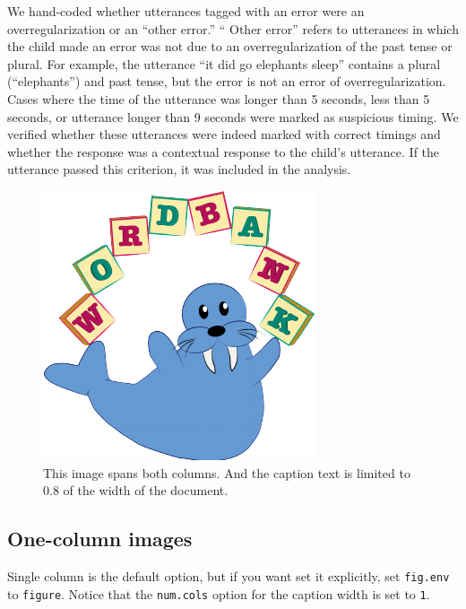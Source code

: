 \documentclass[10pt, letterpaper]{article}
\newenvironment{CodeChunk}{}{}
\begin{document}
We hand-coded whether utterances tagged with an error were an
overregularization or an ``other error.'' `` Other error'' refers to
utterances in which the child made an error was not due to an
overregularization of the past tense or plural. For example, the
utterance ``it did go elephants sleep'' contains a plural
(``elephants'') and past tense, but the error is not an error of
overregularization. Cases where the time of the utterance was longer
than 5 seconds, less than 5 seconds, or utterance longer than 9 seconds
were marked as suspicious timing. We verified whether these utterances
were indeed marked with correct timings and whether the response was a
contextual response to the child's utterance. If the utterance passed
this criterion, it was included in the analysis.

\begin{CodeChunk}
\begin{figure}[h]

{\centering \includegraphics{figs/2-col-image-1} 

}

\caption[This image spans both columns]{This image spans both columns. And the caption text is limited to 0.8 of the width of the document.}\label{fig:2-col-image}
\end{figure}
\end{CodeChunk}

\hypertarget{one-column-images}{%
\subsection{One-column images}\label{one-column-images}}

Single column is the default option, but if you want set it explicitly,
set \texttt{fig.env} to \texttt{figure}. Notice that the
\texttt{num.cols} option for the caption width is set to \texttt{1}.
\end{document}
